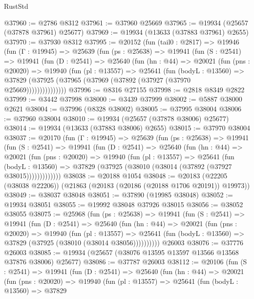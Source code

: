 \begin{lexlean}{RustStd}
\begin{coremodule}
@37960 := @2786 @8312
@37961 := @37960 @25669
@37965 := @19934 (@25657 (@37878 @37961) @25677)
@37969 := @19934 (@13633 (@37883 @37961) @2655)
@37970 := @37930 @8312
@37995 := @20152
    (fun (tail0 : @2817) =>
    @19946
      (fun (Γ : @19945) =>
      @25639
        (fun (ps : @25638) =>
        @19941
          (fun (S : @2541) =>
          @19941
            (fun (D : @2541) =>
            @25640
              (fun (hn : @44) =>
              @20021
                (fun (pns : @20020) =>
                @19940
                  (fun (pl : @13557) =>
                  @25641
                    (fun (bodyL : @13560) =>
                    @37829 (@37925 (@37965 (@37969 (@37892 (@37927 (@37970 @25669)))))))))))))))
@37996 := @8316 @27155
@37998 := @2818 @8349 @2822
@37999 := @3442 @37998
@38000 := @3439 @37999
@38002 := @5887 @38000 @2621
@38004 := @37996 (@8328 @38002)
@38005 := @37995 @38004
@38006 := @37960 @38004
@38010 := @19934 (@25657 (@37878 @38006) @25677)
@38014 := @19934 (@13633 (@37883 @38006) @2655)
@38015 := @37970 @38004
@38037 := @20170
    (fun (Γ : @19945) =>
    @25639
      (fun (ps : @25638) =>
      @19941
        (fun (S : @2541) =>
        @19941
          (fun (D : @2541) =>
          @25640
            (fun (hn : @44) =>
            @20021
              (fun (pns : @20020) =>
              @19940
                (fun (pl : @13557) =>
                @25641
                  (fun (bodyL : @13560) =>
                  @37829 (@37925 (@38010 (@38014 (@37892 (@37927 @38015)))))))))))))
@38038 := @20188 @1054
@38048 := @20183 (@22205 (@38038 @22206)) (@21863 (@20183 (@20186 (@20188 @1706 @20191)) @19973))
@38049 := @38037 @38048
@38051 := @37890 (@19985 @38048)
@38052 := @19934 @38051
@38055 := @19992 @38048 @37926 @38015
@38056 := @38052 @38055
@38075 := @25968
    (fun (ps : @25638) =>
    @19941
      (fun (S : @2541) =>
      @19941
        (fun (D : @2541) =>
        @25640
          (fun (hn : @44) =>
          @20021
            (fun (pns : @20020) =>
            @19940
              (fun (pl : @13557) =>
              @25641 (fun (bodyL : @13560) => @37829 (@37925 (@38010 (@38014 @38056))))))))))
    @26003
@38076 := @37776 @26003
@38085 := @19934 (@25657 (@38076 @13595 @13597 @13566 @13568 @37876 @38006) @25677)
@38086 := @37787 @26003
@38112 := @20106
    (fun (S : @2541) =>
    @19941
      (fun (D : @2541) =>
      @25640
        (fun (hn : @44) =>
        @20021
          (fun (pns : @20020) =>
          @19940
            (fun (pl : @13557) =>
            @25641
              (fun (bodyL : @13560) =>
              @37829

\end{coremodule}
\end{lexlean}
